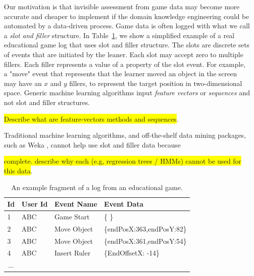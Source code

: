 \documentclass{sigchi}
\newcommand{\hl}[1]{\colorbox{yellow}{#1}}
\begin{document}
	Our motivation is that invisible assessment from game data may become more accurate and cheaper to implement if the domain knowledge engineering could be automated by a data-driven process.
Game data is often logged  with what we call a \textit{slot and filler} structure.
In Table~\ref{tbl:log_example}, we show a simplified example of a real educational game log that uses slot and filler structure.
The slots are discrete sets of events that are initiated by the leaner.
Each slot may accept zero to multiple fillers. 
Each filler represents a value of a property of the slot event.
For example, a "move" event  that represents that the learner moved an object in the screen may have an $x$ and $y$ fillers, to represent the target position in two-dimensional space.
Generic machine learning algorithms input \textit{feature vectors} or \textit{sequences} and not slot and filler structures.

\hl{Describe what are feature-vectors methods and sequences}.

Traditional machine learning algorithms, and off-the-shelf data mining packages, such as Weka \cite{hall2009weka}, cannot help use slot and filler data because

\hl{ complete. describe why each (e.g, regression trees / HMMs) cannot be used for this data}.


\begin{table}[tbh]
\begin{tabular}{@{}llll@{}}
\toprule
\textbf{Id}             & \textbf{User Id} & \textbf{Event Name} & \textbf{Event Data}        \\ \midrule
1                       & ABC              & Game Start          & \{ \}                        \\
2                       & ABC              & Move Object         & \{endPosX:363,endPosY:82\} \\
3                       & ABC              & Move Object         & \{endPosX:361,endPosY:54\} \\
4                       & ABC              & Insert Ruler        & \{EndOffsetX: -14\}        \\
\multicolumn{1}{c}{...} &                  &                     &                            \\ \bottomrule
\end{tabular}
\caption{An example fragment of a log from an educational game. \label{tbl:log_example}}
\end{table}
	
\end{document}
